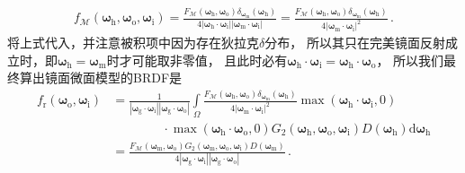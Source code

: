 \begin{align}
    f_{\mathcal{M}}({\bm\omega}_{\mathrm{h}},{\bm\omega}_{\mathrm{o}},{\bm\omega}_{\mathrm{i}})
    =\frac{F_{\mathcal{M}}({\bm\omega}_{\mathrm{h}},{\bm\omega}_{\mathrm{o}})
    \delta_{{\bm\omega}_{\mathrm{m}}}({\bm\omega}_{\mathrm{h}})}
    {4|{\bm\omega}_{\mathrm{h}}\cdot{\bm\omega}_{\mathrm{i}}|
    |{\bm\omega}_{\mathrm{m}}\cdot{\bm\omega}_{\mathrm{i}}|}
    =\frac{F_{\mathcal{M}}({\bm\omega}_{\mathrm{h}},{\bm\omega}_{\mathrm{o}})
    \delta_{{\bm\omega}_{\mathrm{m}}}({\bm\omega}_{\mathrm{h}})}
    {4|{\bm\omega}_{\mathrm{m}}\cdot{\bm\omega}_{\mathrm{i}}|^2}\, .
\end{align}
将上式代入，并注意被积项中因为存在狄拉克$\delta$分布，
所以其只在完美镜面反射成立时，即${\bm\omega}_{\mathrm{h}}={\bm\omega}_{\mathrm{m}}$时才可能取非零值，
且此时必有${\bm\omega}_{\mathrm{h}}\cdot{\bm\omega}_{\mathrm{i}}={\bm\omega}_{\mathrm{h}}\cdot{\bm\omega}_{\mathrm{o}}$，
所以我们最终算出镜面微面模型的BRDF是
\begin{align}\label{eq:08ex01-BRDFMicrofacetFinal}
    f_{\mathrm{r}}({\bm\omega}_{\mathrm{o}},{\bm\omega}_{\mathrm{i}})
     & =\frac{1}{|{\bm\omega}_{\mathrm{g}}\cdot{\bm\omega}_{\mathrm{i}}||{\bm\omega}_{\mathrm{g}}\cdot{\bm\omega}_{\mathrm{o}}|}
    \int\limits_{\varOmega}\frac{F_{\mathcal{M}}({\bm\omega}_{\mathrm{h}},{\bm\omega}_{\mathrm{o}})
    \delta_{{\bm\omega}_{\mathrm{m}}}({\bm\omega}_{\mathrm{h}})}
    {4|{\bm\omega}_{\mathrm{m}}\cdot{\bm\omega}_{\mathrm{i}}|^2}
    \max({\bm\omega}_{\mathrm{h}}\cdot{\bm\omega}_{\mathrm{i}},0)\nonumber                                                       \\
     & \qquad\qquad\cdot\max({\bm\omega}_{\mathrm{h}}\cdot{\bm\omega}_{\mathrm{o}},0)
    G_2({\bm\omega}_{\mathrm{h}},{\bm\omega}_{\mathrm{o}},{\bm\omega}_{\mathrm{i}})
    D({\bm\omega}_{\mathrm{h}})\mathrm{d}{\bm\omega}_{\mathrm{h}}\nonumber                                                       \\
     & =\frac{F_{\mathcal{M}}({\bm\omega}_{\mathrm{m}},{\bm\omega}_{\mathrm{o}})
    G_2({\bm\omega}_{\mathrm{m}},{\bm\omega}_{\mathrm{o}},{\bm\omega}_{\mathrm{i}})D({\bm\omega}_{\mathrm{m}})}
    {4|{\bm\omega}_{\mathrm{g}}\cdot{\bm\omega}_{\mathrm{i}}||{\bm\omega}_{\mathrm{g}}\cdot{\bm\omega}_{\mathrm{o}}|}\, .
\end{align}

